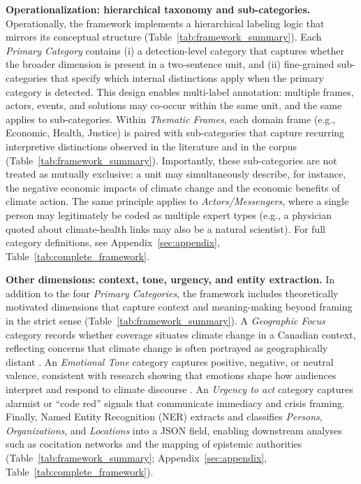 \documentclass[12pt]{article}
\renewcommand\_{\texttt{\detokenize{_}\allowbreak}}
\begin{document}
{\bfseries{Operationalization: hierarchical taxonomy and sub-categories.}} Operationally, the framework implements a hierarchical labeling logic that mirrors its conceptual structure (Table~\ref{tab:framework_summary}). Each \emph{Primary Category} contains (i) a detection-level category that captures whether the broader dimension is present in a two-sentence unit, and (ii) fine-grained sub-categories that specify which internal distinctions apply when the primary category is detected. This design enables multi-label annotation: multiple frames, actors, events, and solutions may co-occur within the same unit, and the same applies to sub-categories. Within \emph{Thematic Frames}, each domain frame (e.g., Economic, Health, Justice) is paired with sub-categories that capture recurring interpretive distinctions observed in the literature and in the corpus (Table~\ref{tab:framework_summary}). Importantly, these sub-categories are not treated as mutually exclusive: a unit may simultaneously describe, for instance, the negative economic impacts of climate change and the economic benefits of climate action. The same principle applies to \emph{Actors/Messengers}, where a single person may legitimately be coded as multiple expert types (e.g., a physician quoted about climate-health links may also be a natural scientist). For full category definitions,  see Appendix~\ref{sec:appendix}, Table~\ref{tab:complete_framework}.

{\bfseries{Other dimensions: context, tone, urgency, and entity extraction.}} In addition to the four \emph{Primary Categories}, the framework includes theoretically motivated dimensions that capture context and meaning-making beyond framing in the strict sense (Table~\ref{tab:framework_summary}). A \emph{Geographic Focus} category records whether coverage situates climate change in a Canadian context, reflecting concerns that climate change is often portrayed as geographically distant \autocite{moser_reflections_2016}. An \emph{Emotional Tone} category captures positive, negative, or neutral valence, consistent with research showing that emotions shape how audiences interpret and respond to climate discourse \autocite{salama_role_2018, nabi_framing_2018}. An \emph{Urgency to act} category captures alarmist or ``code red'' signals that communicate immediacy and crisis framing. Finally, Named Entity Recognition (NER) extracts and classifies \emph{Persons}, \emph{Organizations}, and \emph{Locations} into a JSON field, enabling downstream analyses such as cocitation networks and the mapping of epistemic authorities (Table~\ref{tab:framework_summary}; Appendix~\ref{sec:appendix}, Table~\ref{tab:complete_framework}).
\end{document}
